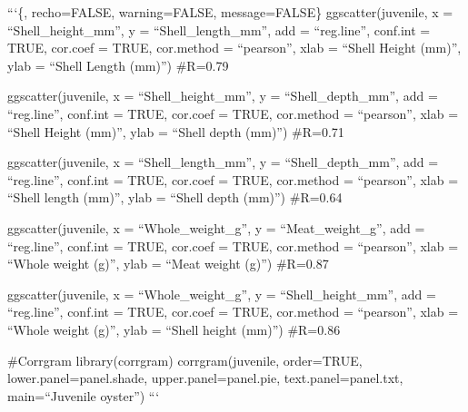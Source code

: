 \documentclass[
]{article}
\begin{document}
```\{, recho=FALSE, warning=FALSE, message=FALSE\} ggscatter(juvenile, x
= ``Shell\_height\_mm'', y = ``Shell\_length\_mm'', add = ``reg.line'',
conf.int = TRUE, cor.coef = TRUE, cor.method = ``pearson'', xlab =
``Shell Height (mm)'', ylab = ``Shell Length (mm)'') \#R=0.79

ggscatter(juvenile, x = ``Shell\_height\_mm'', y = ``Shell\_depth\_mm'',
add = ``reg.line'', conf.int = TRUE, cor.coef = TRUE, cor.method =
``pearson'', xlab = ``Shell Height (mm)'', ylab = ``Shell depth (mm)'')
\#R=0.71

ggscatter(juvenile, x = ``Shell\_length\_mm'', y = ``Shell\_depth\_mm'',
add = ``reg.line'', conf.int = TRUE, cor.coef = TRUE, cor.method =
``pearson'', xlab = ``Shell length (mm)'', ylab = ``Shell depth (mm)'')
\#R=0.64

ggscatter(juvenile, x = ``Whole\_weight\_g'', y = ``Meat\_weight\_g'',
add = ``reg.line'', conf.int = TRUE, cor.coef = TRUE, cor.method =
``pearson'', xlab = ``Whole weight (g)'', ylab = ``Meat weight (g)'')
\#R=0.87

ggscatter(juvenile, x = ``Whole\_weight\_g'', y = ``Shell\_height\_mm'',
add = ``reg.line'', conf.int = TRUE, cor.coef = TRUE, cor.method =
``pearson'', xlab = ``Whole weight (g)'', ylab = ``Shell height (mm)'')
\#R=0.86

\#Corrgram library(corrgram) corrgram(juvenile, order=TRUE,
lower.panel=panel.shade, upper.panel=panel.pie, text.panel=panel.txt,
main=``Juvenile oyster'') ```
\end{document}
